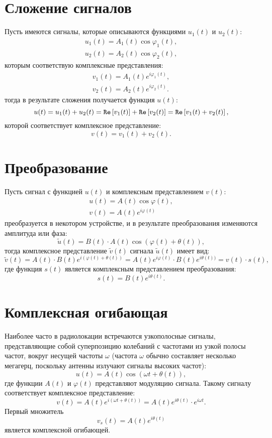 \section{Сложение сигналов}

Пусть имеются сигналы, которые описываются функциями $u_1(t)$ и $u_2(t)$:
\begin{gather*}
    u_1(t) = A_1(t) \cos \varphi_1(t) , \\
    u_2(t) = A_2(t) \cos \varphi_2(t) ,
\end{gather*}
которым соответствую комплексные представления:
\begin{gather*}
    v_1(t) = A_1(t) e^{i \varphi_1(t)} , \\
    v_2(t) = A_2(t) e^{i \varphi_2(t)} .
\end{gather*}
тогда в результате сложения получается функция $u(t)$:
\[
    u(t)
    = u_1(t) + u_2(t)
    = \mathtt{Re} \left [ v_1(t) \right ] + \mathtt{Re} \left [ v_2(t) \right ]
    = \mathtt{Re} \left [ v_1(t) + v_2(t) \right ] ,
\]
которой соответствует комплексное представление:
\[
    v(t) = v_1(t) + v_2(t).
\]


\section{Преобразование}

Пусть сигнал с функцией $u(t)$ и комплексным представлением $v(t)$:
\begin{gather*}
    u(t) = A(t) \cos \varphi(t) , \\
    v(t) = A(t) e^{i \varphi(t)}
\end{gather*}
преобразуется в некотором устройстве, и в результате преобразования изменяются амплитуда или фаза:
\[
    \widetilde{u}(t) = B(t) \cdot A(t) \cos ( \varphi(t) + \theta(t) ) ,
\]
тогда комплексное представление $\widetilde{v}(t)$ сигнала $\widetilde{u}(t)$ имеет вид:
\[
    \widetilde{v}(t)
    = A(t) \cdot B(t) e^{i (\varphi(t) + \theta(t))}
    = A(t) e^{i \varphi(t)} \cdot B(t) e^{i \theta(t))} = v(t) \cdot s(t),
\]
где функция $s(t)$ является комплексным представлением преобразования:
\[
    s(t) = B(t) e^{i \theta(t)} .
\]


\section{Комплексная огибающая}

Наиболее часто в радиолокации встречаются узкополосные сигналы, представляющие собой суперпозицию колебаний с частотами из узкой полосы частот, вокруг несущей
частоты $\omega$ (частота $\omega$ обычно составляет несколько мегагерц, поскольку антенны излучают сигналы высоких частот):
\[
    u(t) = A(t) \cos ( \omega t + \theta(t) ),
\]
где функции $A(t)$ и $\varphi(t)$ представляют модуляцию сигнала. Такому сигналу соответствует комплексное представление:
\[
    v(t)
    = A(t) e^{i ( \omega t + \theta(t) )}
    = A(t) e^{i \theta(t)} \cdot e^{i \omega t} .
\]
Первый множитель
\[
    v_s(t) = A(t) e^{i \theta(t)}
\]
является комплексной огибающей.


